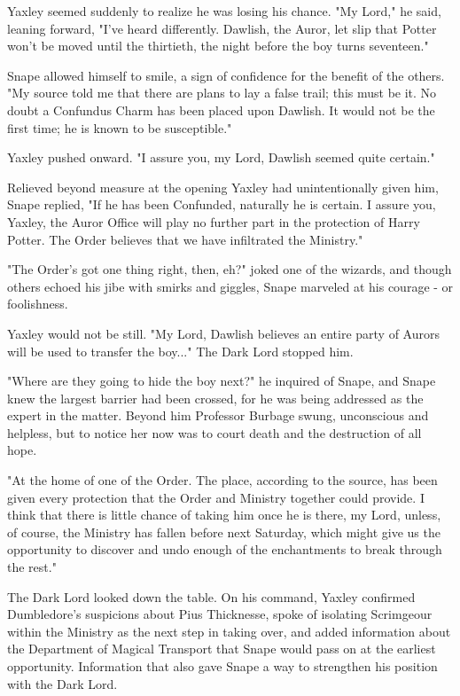Yaxley seemed suddenly to realize he was losing his chance. "My Lord," he said, leaning forward, "I've heard differently. Dawlish, the Auror, let slip that Potter won't be moved until the thirtieth, the night before the boy turns seventeen."

Snape allowed himself to smile, a sign of confidence for the benefit of the others. "My source told me that there are plans to lay a false trail; this must be it. No doubt a Confundus Charm has been placed upon Dawlish. It would not be the first time; he is known to be susceptible."

Yaxley pushed onward. "I assure you, my Lord, Dawlish seemed quite certain."

Relieved beyond measure at the opening Yaxley had unintentionally given him, Snape replied, "If he has been Confunded, naturally he is certain. I assure you, Yaxley, the Auror Office will play no further part in the protection of Harry Potter. The Order believes that we have infiltrated the Ministry."

"The Order's got one thing right, then, eh?" joked one of the wizards, and though others echoed his jibe with smirks and giggles, Snape marveled at his courage - or foolishness.

Yaxley would not be still. "My Lord, Dawlish believes an entire party of Aurors will be used to transfer the boy..." The Dark Lord stopped him.

"Where are they going to hide the boy next?" he inquired of Snape, and Snape knew the largest barrier had been crossed, for he was being addressed as the expert in the matter. Beyond him Professor Burbage swung, unconscious and helpless, but to notice her now was to court death and the destruction of all hope.

"At the home of one of the Order. The place, according to the source, has been given every protection that the Order and Ministry together could provide. I think that there is little chance of taking him once he is there, my Lord, unless, of course, the Ministry has fallen before next Saturday, which might give us the opportunity to discover and undo enough of the enchantments to break through the rest."

The Dark Lord looked down the table. On his command, Yaxley confirmed Dumbledore's suspicions about Pius Thicknesse, spoke of isolating Scrimgeour within the Ministry as the next step in taking over, and added information about the Department of Magical Transport that Snape would pass on at the earliest opportunity. Information that also gave Snape a way to strengthen his position with the Dark Lord.

